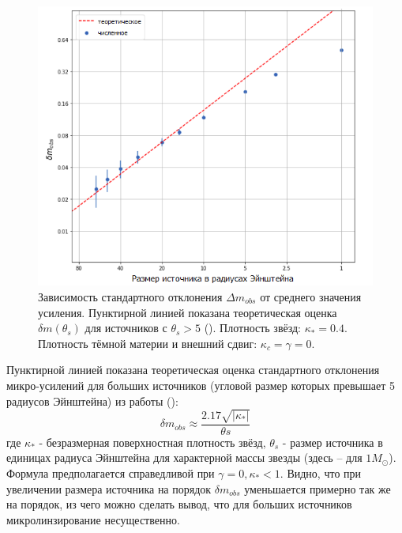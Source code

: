 \begin{figure}[H]
    \centering
	\includegraphics[scale=0.69]{pics/size_np_std.png}
	\caption{Зависимость стандартного отклонения $\Delta m_{obs}$ от среднего значения усиления. Пунктирной линией показана теоретическая оценка $\delta m (\theta_s)$ для источников с $\theta_s > 5$ (\cite{refsdalstabell1991}). Плотность звёзд: $\kappa_*=0.4$. Плотность тёмной материи и внешний сдвиг: $\kappa_c=\gamma=0$. \label{fig:refstab} } 
\end{figure}
Пунктирной линией показана теоретическая оценка стандартного отклонения микро-усилений для больших источников (угловой размер которых превышает 5 радиусов Эйнштейна) из работы (\cite{refsdalstabell1991}):
\begin{equation}
\delta m_{o b s} \approx \frac{2.17 \sqrt{|\kappa_*|}}{\theta s}
\end{equation}
где $\kappa_*$ - безразмерная поверхностная плотность звёзд, $\theta_s$ - размер источника в единицах радиуса Эйнштейна для характерной массы звезды (здесь -- для $1 M_{\odot} $). Формула предполагается справедливой при $\gamma=0, \kappa_* < 1$. 
Видно, что при увеличении размера источника на порядок $\delta m_{obs}$ уменьшается примерно так же на порядок, из чего можно сделать вывод, что для больших источников микролинзирование несущественно.